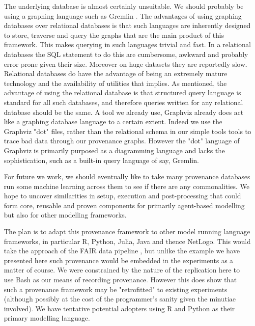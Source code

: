 \documentclass[runningheads]{llncs}
\begin{document}
The underlying database is almost certainly unsuitable. We should probably be
using a graphing language such as Gremlin \cite{rodriguez2015gremlin}. The
advantages of using graphing databases over relational databases is that such
languages are inherently designed to store, traverse and query the graphs that
are the main product of this framework. This makes querying in such languages
trivial and fast. In a relational databases the SQL statement to do this are
cumbersome, awkward and probably error prone given their size. Moreover on huge
datasets they are reportedly slow. Relational databases do have the advantage
of being an extremely mature technology and the availability of utilities that
implies. As mentioned, the advantage of using the relational database is that
structured query language is standard for all such databases, and therefore
queries written for any relational database should be the same. A tool we
already use, Graphviz already does act like a graphing database language to a
certain extent. Indeed we use the Graphviz "dot" files, rather than the
relational schema in our simple tools tools to trace bad data through our
provenance graphs.  However the "dot" language of Graphviz is primarily
purposed as a diagramming language and lacks the sophistication, such as a
built-in query language of say, Gremlin.

For future we work, we should eventually like to take many provenance databases run some machine learning across them to see if there are any commonalities. We hope to uncover similarities in setup, execution and post-processing that could form core, reusable and proven components for primarily agent-based modelling but also for other modelling frameworks.

The plan is to adapt this provenance framework to other model running language
frameworks, in particular R, Python, Julia, Java and thence NetLogo. This would
take the approach of the FAIR data pipeline \cite{mitchell2022fair}, but unlike
the example we have presented here such provenance would be embedded in the
experiments as a matter of course. We were constrained by the nature of the
replication here to use Bash as our means of recording provenance. However this
does show that such a provenance framework may be "retrofitted" to existing
experiments (although possibly at the cost of the programmer's sanity given the
minutiae involved). We have tentative potential adopters using R and Python as their primary modelling language.

%
%


% 
%
\end{document}
